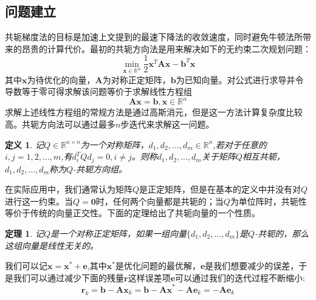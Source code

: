 \documentclass{ctexart}
\newtheorem{Def}{\hspace{2em}定义}
\newtheorem{Theo}{\hspace{2em}定理}
\begin{document}
\subsection{问题建立}
共轭梯度法的目标是加速上文提到的最速下降法的收敛速度，同时避免牛顿法所带来的昂贵的计算代价。最初的共轭方向法是用来解决如下的无约束二次规划问题：
\begin{equation}
\mathop{\min}\limits_{\mathbf{x}\in\mathbb{R}^n}\frac{1}{2}\mathbf{x}^T\mathbf{A}\mathbf{x}-\mathbf{b}^T\mathbf{x}\label{cg_problem}
\end{equation}
其中$\mathbf{x}$为待优化的向量，$\mathbf{A}$为对称正定矩阵，$\mathbf{b}$为已知向量。对公式进行求导并令导数等于零可得求解该问题等价于求解线性方程组
\begin{equation}
\mathbf{Ax}=\mathbf{b},\mathbf{x}\in\mathbb{R}^n
\end{equation}
求解上述线性方程组的常规方法是通过高斯消元，但是这一方法计算复杂度比较高。共轭方向法可以通过最多$n$步迭代来求解这一问题。
\begin{Def}
	记$Q\in\mathbb{R}^{n\times n}$为一个对称矩阵，$d_1,d_2,\dots,d_m\in\mathbb{R}^n$,若对于任意的$i,j=1,2,\dots,m$,有$d_i^TQd_j=0,i\ne j$。则称$d_1,d_2,\dots,d_m$关于矩阵$Q$相互共轭，$d_1,d_2,\dots,d_m$称为$Q$-共轭方向组。
\end{Def}


在实际应用中，我们通常认为矩阵$Q$是正定矩阵，但是在基本的定义中并没有对$Q$进行这一约束。当$Q=\mathbf{0}$时，任何两个向量都是共轭的；当$Q$为单位阵时，共轭性等价于传统的向量正交性。下面的定理给出了共轭向量的一个性质。
\begin{Theo}
	记$Q$是一个对称正定矩阵，如果一组向量$\{d_1,d_2,\dots,d_m\}$是$Q$-共轭的，那么这组向量是线性无关的。\label{theo_inde} 
\end{Theo}
我们可以记$\mathbf{x}=\mathbf{x}^*+\mathbf{e}$,其中$\mathbf{x}^*$是优化问题的最优解，$\mathbf{e}$是我们想要减少的误差，于是我们可以通过减少下面的残量$\mathbf{r}$这样误差项$\mathbf{e}$可以通过我们的迭代过程不断缩小:
\begin{equation}
\mathbf{r}_k=\mathbf{b}-\mathbf{Ax}_k=\mathbf{b}-\mathbf{Ax}^*-\mathbf{Ae}_k=-\mathbf{Ae}_k
\end{equation}
\end{document}
